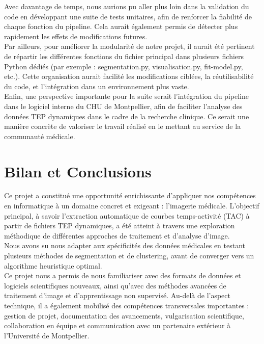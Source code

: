 \documentclass[a4paper]{article}
\begin{document}
    \noindent
    Avec davantage de temps, nous aurions pu aller plus loin dans la validation du code en développant une suite de tests unitaires, afin de renforcer la fiabilité de chaque fonction du pipeline. Cela aurait également permis de détecter plus rapidement les effets de modifications futures.\\
    
    \noindent
    Par ailleurs, pour améliorer la modularité de notre projet, il aurait été pertinent de répartir les différentes fonctions du fichier principal dans plusieurs fichiers Python dédiés (par exemple : segmentation.py, visualisation.py, fit-model.py, etc.). Cette organisation aurait facilité les modifications ciblées, la réutilisabilité du code, et l’intégration dans un environnement plus vaste.\\
    
    \noindent
    Enfin, une perspective importante pour la suite serait l’intégration du pipeline dans le logiciel interne du CHU de Montpellier, afin de faciliter l’analyse des données TEP dynamiques dans le cadre de la recherche clinique. Ce serait une manière concrète de valoriser le travail réalisé en le mettant au service de la communauté médicale.
      
\newpage
\section{Bilan et Conclusions}
    Ce projet a constitué une opportunité enrichissante d’appliquer nos compétences en informatique à un domaine concret et exigeant : l’imagerie médicale. L’objectif principal, à savoir l’extraction automatique de courbes temps-activité (TAC) à partir de fichiers TEP dynamiques, a été atteint à travers une exploration méthodique de différentes approches de traitement et d’analyse d’image. \\
    
    \noindent
    Nous avons su nous adapter aux spécificités des données médicales en testant plusieurs méthodes de segmentation et de clustering, avant de converger vers un algorithme heuristique optimal. \\
    
    \noindent
    Ce projet nous a permis de nous familiariser avec des formats de données et logiciels scientifiques nouveaux, ainsi qu’avec des méthodes avancées de traitement d’image et d’apprentissage non supervisé. Au-delà de l’aspect technique, il a également mobilisé des compétences transversales importantes : gestion de projet, documentation des avancements, vulgarisation scientifique, collaboration en équipe et communication avec un partenaire extérieur à l’Université de Montpellier. \\
    
\end{document}
